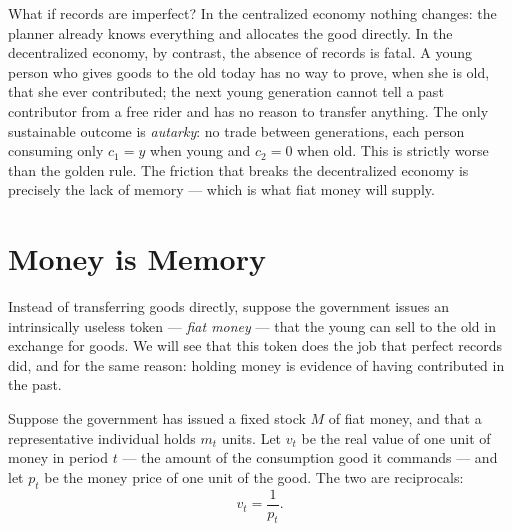 
What if records are imperfect? In the centralized economy nothing changes: the planner already knows everything and allocates the good directly. In the decentralized economy, by contrast, the absence of records is fatal. A young person who gives goods to the old today has no way to prove, when she is old, that she ever contributed; the next young generation cannot tell a past contributor from a free rider and has no reason to transfer anything. The only sustainable outcome is \emph{autarky}: no trade between generations, each person consuming only $c_1 = y$ when young and $c_2 = 0$ when old. This is strictly worse than the golden rule. The friction that breaks the decentralized economy is precisely the lack of memory --- which is what fiat money will supply.

\section{Money is Memory}

Instead of transferring goods directly, suppose the government issues an intrinsically useless token --- \emph{fiat money} --- that the young can sell to the old in exchange for goods. We will see that this token does the job that perfect records did, and for the same reason: holding money is evidence of having contributed in the past.


Suppose the government has issued a fixed stock $M$ of fiat money, and that a representative individual holds $m_t$ units. Let $v_t$ be the real value of one unit of money in period $t$ --- the amount of the consumption good it commands --- and let $p_t$ be the money price of one unit of the good. The two are reciprocals:
\[
v_t = \frac{1}{p_t}.
\]

